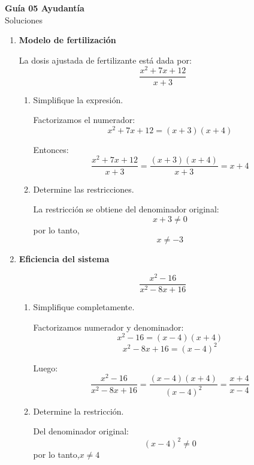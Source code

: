 \documentclass[11pt]{article}
\begin{document}
	
	\vspace*{0.5em}
	
	\begin{center}
		{\Large \textbf{Guía 05 Ayudantía}}\\[0.3em]
		{\small Soluciones}
	\end{center}
	
	\vspace{0.2cm}
	
	
\begin{enumerate}
	
	\item \textbf{Modelo de fertilización}
	
	La dosis ajustada de fertilizante está dada por:
	\[
	\frac{x^2+7x+12}{x+3}
	\]
	
		\begin{enumerate}[label=\alph*)]
		\item Simplifique la expresión.
		
		Factorizamos el numerador:
		\[
		x^2+7x+12=(x+3)(x+4)
		\]
		
		Entonces:
		\[
		\frac{x^2+7x+12}{x+3}
		=
		\frac{(x+3)(x+4)}{x+3}
		=
		x+4
		\]
		
		\item Determine las restricciones.
		
		La restricción se obtiene del denominador original:
		\[
		x+3\neq 0
		\]
		por lo tanto,
		\[
		\boxed{x\neq -3}
		\]
		\end{enumerate}
	
	\vspace{0.4cm}
	
	\item \textbf{Eficiencia del sistema}
	
	\[
	\frac{x^2-16}{x^2-8x+16}
	\]
	
		\begin{enumerate}[label=\alph*)]
		\item Simplifique completamente.
		
		Factorizamos numerador y denominador:
		\[
		x^2-16=(x-4)(x+4)
		\]
		\[
		x^2-8x+16=(x-4)^2
		\]
		
		Luego:
		\[
		\frac{x^2-16}{x^2-8x+16}
		=
		\frac{(x-4)(x+4)}{(x-4)^2}
		=
		\frac{x+4}{x-4}
		\]
		
		\item Determine la restricción.
		
		Del denominador original:
		\[
		(x-4)^2\neq 0
		\]
		por lo tanto,$\boxed{x\neq 4}$
		\end{enumerate}
	

\end{enumerate}
\end{document}

